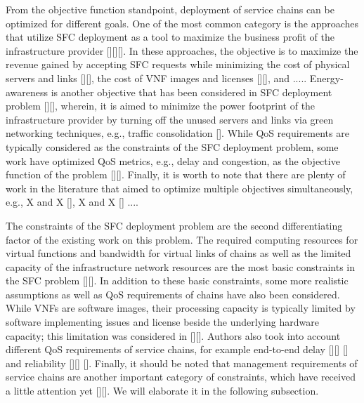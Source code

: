 From the objective function standpoint, deployment of service chains can be optimized for different goals. One of the most common category is the approaches that utilize SFC deployment as a tool to maximize the business profit of the infrastructure provider [][][]. In these approaches, the objective is to maximize the revenue gained by accepting SFC requests while minimizing the cost of physical servers and links [][], the cost of VNF images and licenses [][], and ..... Energy-awareness is another objective that has been considered in SFC deployment problem [][], wherein, it is aimed to minimize the power footprint of the infrastructure provider by turning off the unused servers and links via green networking techniques, e.g., traffic consolidation  []. While QoS requirements are typically considered as the constraints of the SFC deployment problem, some work have optimized QoS metrics, e.g., delay and congestion, as the objective function of the problem  [][]. Finally, it is worth to note that there are plenty of work in the literature that aimed to optimize multiple objectives simultaneously, e.g., X and X  [], X and X  [] .... 

The constraints of the SFC deployment problem are the second differentiating factor of the existing work on this problem. The required computing resources for virtual functions and bandwidth for virtual links of chains as well as the limited capacity of the infrastructure network resources are the most basic constraints in the SFC problem [][]. In addition to these basic constraints, some more realistic assumptions as well as QoS requirements of chains have also been considered. While VNFs are software images, their processing capacity is typically limited by software implementing issues and license beside the underlying hardware capacity; this  limitation was considered in [][]. Authors also took into account different QoS requirements of service chains, for example end-to-end delay [][] [] and reliability [][] []. Finally, it should be noted that management requirements of service chains are another important category of constraints, which have received a little attention yet [][]. We will elaborate it in the following subsection.  

